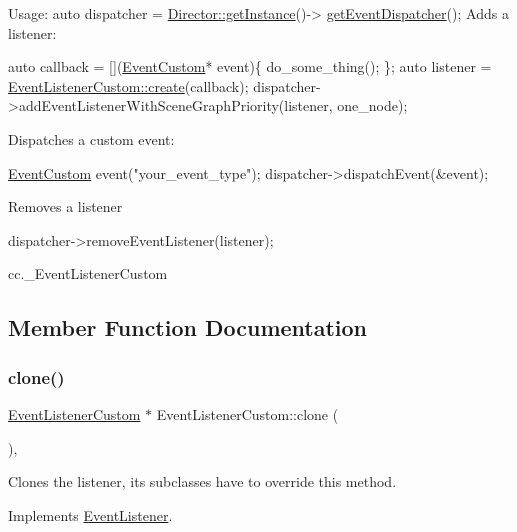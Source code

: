 \begin{DoxyCode}
Usage:
      \textcolor{keyword}{auto} dispatcher = \hyperlink{classDirector_a8d2a4ca9e20cd400ddadd516efa111e0}{Director::getInstance}()->
      \hyperlink{classDirector_ae5984b5ba756d210fa4ec79578d17ca8}{getEventDispatcher}();
   Adds a listener:

      \textcolor{keyword}{auto} callback = [](\hyperlink{classEventCustom}{EventCustom}* event)\{ do\_some\_thing(); \};
      \textcolor{keyword}{auto} listener = \hyperlink{classEventListenerCustom_a9c87b50cc58d3050eea1dd4ae564f430}{EventListenerCustom::create}(callback);
      dispatcher->addEventListenerWithSceneGraphPriority(listener, one\_node);

   Dispatches a custom event:

      \hyperlink{classEventCustom}{EventCustom} event(\textcolor{stringliteral}{"your\_event\_type"});
      dispatcher->dispatchEvent(&event);

   Removes a listener

      dispatcher->removeEventListener(listener);
\end{DoxyCode}
  cc.\+\_\+\+Event\+Listener\+Custom 

\subsection{Member Function Documentation}
\mbox{\label{classEventListenerCustom_a9a8bffb7f8169c9ca32aba3bf4cd74bc}} 
\subsubsection{\texorpdfstring{clone()}{clone()}\hspace{0.1cm}{\footnotesize\ttfamily [1/2]}}
{\footnotesize\ttfamily \hyperlink{classEventListenerCustom}{Event\+Listener\+Custom} $\ast$ Event\+Listener\+Custom\+::clone (\begin{DoxyParamCaption}{ }\end{DoxyParamCaption})\hspace{0.3cm}{\ttfamily [override]}, {\ttfamily [virtual]}}

Clones the listener, its subclasses have to override this method. 

Implements \hyperlink{classEventListener_a8707b41e85031f08e48def3584d51bc0}{Event\+Listener}.

